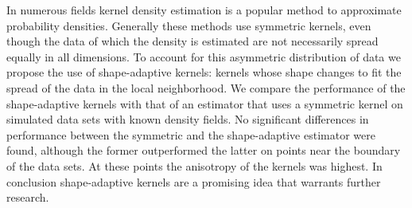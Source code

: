 \noindent In numerous fields kernel density estimation is a popular method to approximate probability densities.
Generally these methods use symmetric kernels, even though the data of which the density is estimated are not necessarily spread equally in all dimensions. To account for this asymmetric distribution of data we propose the use of shape-adaptive kernels: kernels whose shape changes to fit the spread of the data in the local neighborhood.
We compare the performance of the shape-adaptive kernels with that of an estimator that uses a symmetric kernel on simulated data sets with known density fields.
No significant differences in performance between the symmetric and the shape-adaptive estimator were found, although the former outperformed the latter on points near the boundary of the data sets. At these points the anisotropy of the kernels was highest. 
In conclusion shape-adaptive kernels are a promising idea that warrants further research.
